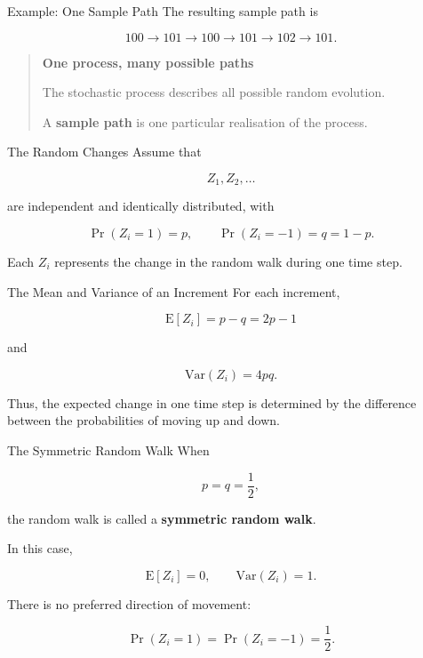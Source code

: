 \documentclass[
  ignorenonframetext,
  aspectratio=169,
]{beamer}
\begin{document}
\begin{frame}{Example: One Sample Path}
\protect{}\label{example-one-sample-path-1}
The resulting sample path is

\[
100\rightarrow101\rightarrow100\rightarrow101\rightarrow102\rightarrow101.
\]

\begin{quote}
\textbf{One process, many possible paths}

The stochastic process describes all possible random evolution.

A \textbf{sample path} is one particular realisation of the process.
\end{quote}
\end{frame}

\begin{frame}{The Random Changes}
\protect{}\label{the-random-changes}
Assume that

\[
Z_1,Z_2,\ldots
\]

are independent and identically distributed, with

\[
\Pr(Z_i=1)=p,
\qquad
\Pr(Z_i=-1)=q=1-p.
\]

Each \(Z_i\) represents the change in the random walk during one time
step.
\end{frame}

\begin{frame}{The Mean and Variance of an Increment}
\protect{}\label{the-mean-and-variance-of-an-increment}
For each increment,

\[
\mathrm{E}[Z_i]
=
p-q
=
2p-1
\]

and

\[
\mathrm{Var}(Z_i)
=
4pq.
\]

Thus, the expected change in one time step is determined by the
difference between the probabilities of moving up and down.
\end{frame}

\begin{frame}{The Symmetric Random Walk}
\protect{}\label{the-symmetric-random-walk}
When

\[
p=q=\frac12,
\]

the random walk is called a \textbf{symmetric random walk}.

In this case,

\[
\mathrm{E}[Z_i]=0,
\qquad
\mathrm{Var}(Z_i)=1.
\]

There is no preferred direction of movement:

\[
\Pr(Z_i=1)=\Pr(Z_i=-1)=\frac12.
\]
\end{frame}
\end{document}
